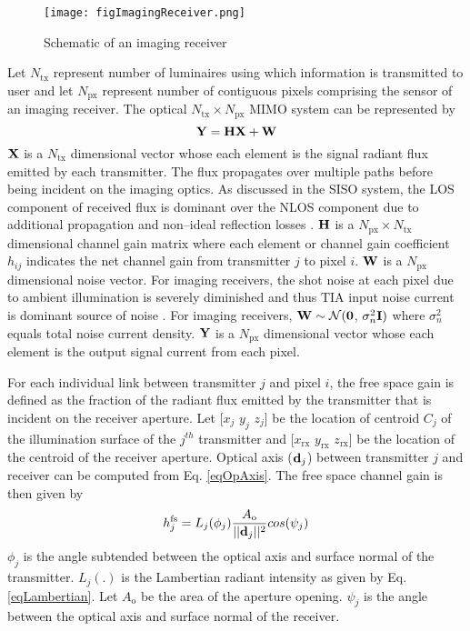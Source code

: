 \begin{figure}[!t]
	\centering
		\texttt{[image: figImagingReceiver.png]}
	\caption{Schematic of an imaging receiver}
	\label{figImagingReceiver}
\end{figure}

Let $N_{\text{tx}}$ represent number of luminaires using which information is transmitted to user and let $N_{\text{px}}$ represent number of contiguous pixels comprising the sensor of an imaging receiver. The optical $N_{\text{tx}} \times N_{\text{px}}$ MIMO system can be represented by
\begin{equation}
	\label{eqMimoChannel3}
	\bf{Y} = \bf{H}\bf{X} + \bf{W}
\end{equation}
$\bf{X}$ is a $N_{\text{tx}}$ dimensional vector whose each element is the signal radiant flux emitted by each transmitter. The flux propagates over multiple paths before being incident on the imaging optics. As discussed in the SISO system, the LOS component of received flux is dominant over the NLOS component due to additional propagation and non--ideal reflection losses . $\bf{H}$ is a $N_{\text{px}}\times N_{\text{tx}}$ dimensional channel gain matrix where each element or channel gain coefficient $h_{ij}$ indicates the net channel gain from transmitter $j$ to pixel $i$. $\bf{W}$ is a $N_{\text{px}}$ dimensional noise vector. For imaging receivers, the shot noise at each pixel due to ambient illumination is severely diminished \cite{dja00a} and thus TIA input noise current is dominant source of noise \cite{kah97a}. For imaging receivers, ${\bf{W}}\sim\mathcal{N}({\bf{0}}$, $\sigma_{n}^2{\bf{I}})$ where $\sigma_{n}^{2}$ equals total noise current density. $\bf{Y}$ is a $N_{\text{px}}$ dimensional vector whose each element is the output signal current from each pixel.

For each individual link between transmitter $j$ and pixel $i$, the free space gain is defined as the fraction of the radiant flux emitted by the transmitter that is incident on the receiver aperture. Let [$x_{j}$ $y_{j}$ $z_{j}$] be the location of centroid $C_{j}$ of the illumination surface of the $j^{th}$ transmitter and [$x_{\text{rx}}$ $y_{\text{rx}}$ $z_{\text{rx}}$] be the location of the centroid of the receiver aperture. Optical axis (${\bf{d}}_{j}$) between transmitter $j$ and receiver can be computed from Eq. \eqref{eqOpAxis}. The free space channel gain is then given by
\begin{equation}
	\label{eqMimoHFS}
	h^{\text{fs}}_{j} = L_{j}(\phi_{j})\frac{A_{\text{o}}}{||{\bf{d}}_{j}||^2}cos(\psi_{j})
\end{equation}
$\phi_{j}$ is the angle subtended between the optical axis and surface normal of the transmitter. $L_{j}(.)$ is the Lambertian radiant intensity as given by Eq. \eqref{eqLambertian}. Let $A_{\text{o}}$ be the area of the aperture opening. $\psi_{j}$ is the angle between the optical axis and surface normal of the receiver.

